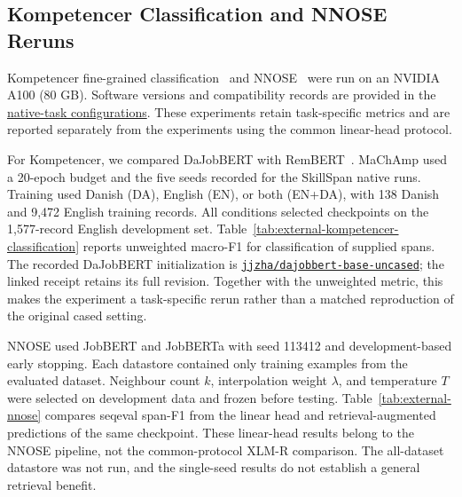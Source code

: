 \subsection{Kompetencer Classification and NNOSE Reruns}
Kompetencer fine-grained classification~\citep{jensen2022kompetencer} and NNOSE~\citep{zhang2024nnose} were run on an NVIDIA A100 (80 GB). Software versions and compatibility records are provided in the \href{https://github.com/AlfredJamesLi/chinese-skillspan-benchmark/blob/1d1c24e20ee049fc768034b5baf58fa882e08e2c/reproduction/process_archive_20260924/secondary_review/source/tex/external_benchmarks/paper_A_native.tex}{native-task configurations}. These experiments retain task-specific metrics and are reported separately from the experiments using the common linear-head protocol.

For Kompetencer, we compared DaJobBERT with RemBERT~\citep{chung2021rembert}. MaChAmp used a 20-epoch budget and the five seeds recorded for the SkillSpan native runs. Training used Danish (DA), English (EN), or both (EN+DA), with 138 Danish and 9,472 English training records. All conditions selected checkpoints on the 1,577-record English development set. Table~\ref{tab:external-kompetencer-classification} reports unweighted macro-F1 for classification of supplied spans. The recorded DaJobBERT initialization is \href{https://github.com/AlfredJamesLi/chinese-skillspan-benchmark/blob/b84f218b7142c97ab03a60499a9b30e7ec332cab/results_snapshots/a_native_20260924/A_NATIVE_RECEIPT.md}{\texttt{jjzha/dajobbert-base-uncased}}; the linked receipt retains its full revision. Together with the unweighted metric, this makes the experiment a task-specific rerun rather than a matched reproduction of the original cased setting.

NNOSE used JobBERT and JobBERTa with seed 113412 and development-based early stopping. Each datastore contained only training examples from the evaluated dataset. Neighbour count $k$, interpolation weight $\lambda$, and temperature $T$ were selected on development data and frozen before testing. Table~\ref{tab:external-nnose} compares seqeval span-F1 from the linear head and retrieval-augmented predictions of the same checkpoint. These linear-head results belong to the NNOSE pipeline, not the common-protocol XLM-R comparison. The all-dataset datastore was not run, and the single-seed results do not establish a general retrieval benefit.

